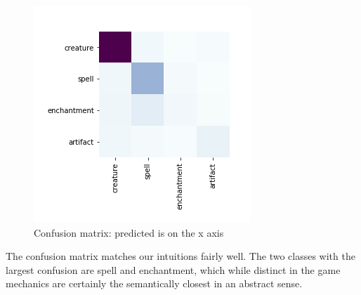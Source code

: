\documentclass[letterpaper]{article} %
\begin{document}
\begin{figure}
  \includegraphics[width=.5\textwidth]{text-confusion-matrix}
  \caption{Confusion matrix: predicted is on the x axis}
\end{figure}

The confusion matrix matches our intuitions fairly well.
The two classes with the largest confusion are spell and enchantment,
which while distinct in the game mechanics
are certainly the semantically closest in an abstract sense.



\end{document}
